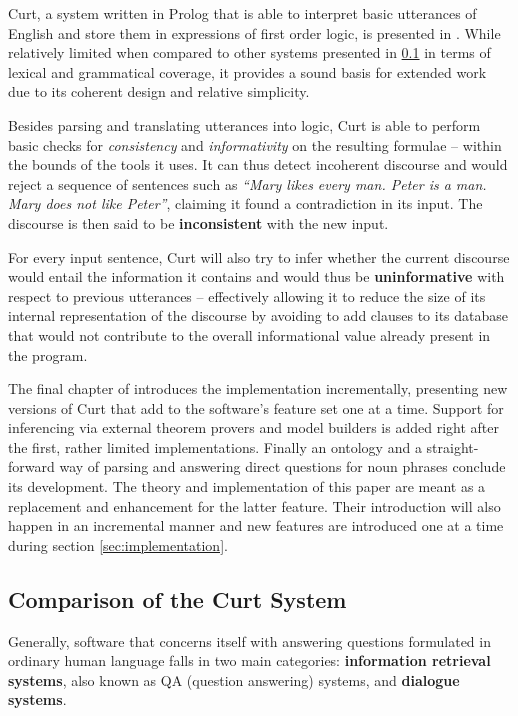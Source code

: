 \documentclass[a4paper]{article}
\newcommand{\abbr}{\textsf} %
\newcommand{\term}[1]{\textsf{\textbf{#1}}} %
\newcommand{\pn}{\textsf} %
\newcommand{\curt}{\pn{Curt}}
\newcommand{\prol}{\pn{Prolog}}
\theoremstyle{remark}
\theoremstyle{remark}
\theoremstyle{definition}
\theoremstyle{definition}
\begin{document}
\curt, a system written in \prol{} that is able to interpret basic utterances
of English and store them in expressions of first order logic, is
presented in \cite[chapter 6]{blackburnbos:cl1}. While relatively limited when
compared to other systems presented in \ref{sec:comparison} in terms of lexical
and grammatical coverage, it provides a sound basis for extended work due to
its coherent design and relative simplicity.

Besides parsing and translating utterances into logic, \curt{} is able to perform
basic checks for \emph{consistency} and \emph{informativity} on the resulting
formulae -- within the bounds of the tools it uses.
It can thus detect incoherent discourse and would reject a sequence of
sentences such as \emph{``Mary likes every man. Peter is a man. Mary does not
like Peter''}, claiming it found a contradiction in its input. The discourse is
then said to be \term{inconsistent} with the new input.

For every input
sentence, \curt{} will also try to infer whether the current discourse would
entail the information it contains and would thus be \term{uninformative} with
respect to previous utterances – effectively allowing it to
reduce the size of its internal representation of the discourse by avoiding to
add clauses to its database that would not contribute to the overall informational value
already present in the program.

The final chapter of \cite{blackburnbos:cl1} introduces the implementation
incrementally, presenting new versions of \curt{} that add to the software's
feature set one at a time. Support for inferencing via external theorem provers
and model builders is added right after the first, rather limited implementations.
Finally an ontology and a straight-forward way of parsing and answering direct
questions for noun phrases conclude its development. The theory and
implementation of this paper are meant as a replacement and enhancement for the
latter feature. Their introduction will also happen in an incremental manner and new features
are introduced one at a time during section \ref{sec:implementation}.

\subsection{Comparison of the Curt System}\label{sec:comparison}

Generally, software that concerns itself with answering questions formulated in
ordinary human language falls in two main categories: \term{information
retrieval systems}, also known as \abbr{QA} (question answering) systems, and
\term{dialogue systems}.
\end{document}
